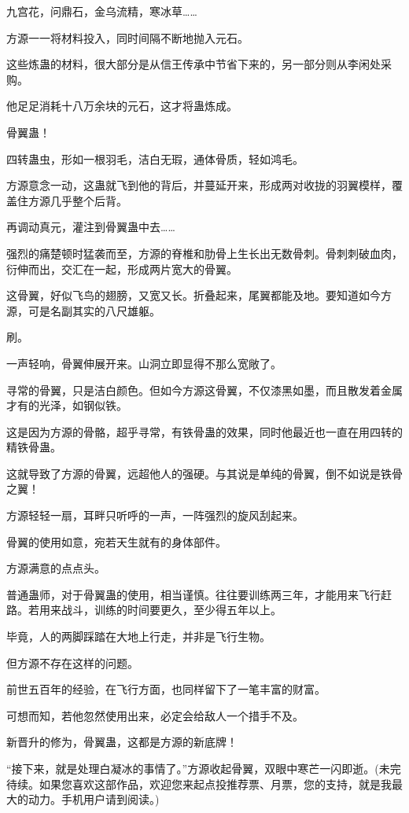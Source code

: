 \begin{this_body}
九宫花，问鼎石，金乌流精，寒冰草……

方源一一将材料投入，同时间隔不断地抛入元石。

这些炼蛊的材料，很大部分是从信王传承中节省下来的，另一部分则从李闲处采购。

他足足消耗十八万余块的元石，这才将蛊炼成。

骨翼蛊！

四转蛊虫，形如一根羽毛，洁白无瑕，通体骨质，轻如鸿毛。

方源意念一动，这蛊就飞到他的背后，并蔓延开来，形成两对收拢的羽翼模样，覆盖住方源几乎整个后背。

再调动真元，灌注到骨翼蛊中去……

强烈的痛楚顿时猛袭而至，方源的脊椎和肋骨上生长出无数骨刺。骨刺刺破血肉，衍伸而出，交汇在一起，形成两片宽大的骨翼。

这骨翼，好似飞鸟的翅膀，又宽又长。折叠起来，尾翼都能及地。要知道如今方源，可是名副其实的八尺雄躯。

刷。

一声轻响，骨翼伸展开来。山洞立即显得不那么宽敞了。

寻常的骨翼，只是洁白颜色。但如今方源这骨翼，不仅漆黑如墨，而且散发着金属才有的光泽，如钢似铁。

这是因为方源的骨骼，超乎寻常，有铁骨蛊的效果，同时他最近也一直在用四转的精铁骨蛊。

这就导致了方源的骨翼，远超他人的强硬。与其说是单纯的骨翼，倒不如说是铁骨之翼！

方源轻轻一扇，耳畔只听呼的一声，一阵强烈的旋风刮起来。

骨翼的使用如意，宛若天生就有的身体部件。

方源满意的点点头。

普通蛊师，对于骨翼蛊的使用，相当谨慎。往往要训练两三年，才能用来飞行赶路。若用来战斗，训练的时间要更久，至少得五年以上。

毕竟，人的两脚踩踏在大地上行走，并非是飞行生物。

但方源不存在这样的问题。

前世五百年的经验，在飞行方面，也同样留下了一笔丰富的财富。

可想而知，若他忽然使用出来，必定会给敌人一个措手不及。

新晋升的修为，骨翼蛊，这都是方源的新底牌！

“接下来，就是处理白凝冰的事情了。”方源收起骨翼，双眼中寒芒一闪即逝。(未完待续。如果您喜欢这部作品，欢迎您来起点投推荐票、月票，您的支持，就是我最大的动力。手机用户请到阅读。)

\end{this_body}

